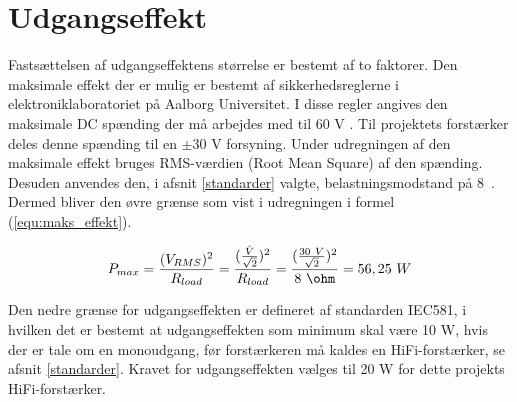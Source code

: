\section{Udgangseffekt}
\label{valg_udgangseffekt}
Fastsættelsen af udgangseffektens størrelse er bestemt af to faktorer. Den maksimale effekt der er mulig er bestemt af sikkerhedsreglerne i elektroniklaboratoriet på Aalborg Universitet. I disse regler angives den maksimale DC spænding der må arbejdes med til 60 V \cite{elregler-b1101}. 
Til projektets forstærker deles denne spænding til en $\pm$30 V forsyning. Under udregningen af den maksimale effekt bruges RMS-værdien (Root Mean Square) af den spænding. Desuden anvendes den, i afsnit \ref{standarder} valgte, belastningsmodstand på 8~\ohm. Dermed bliver den øvre grænse som vist i udregningen i formel (\ref{equ:maks_effekt}).

\begin{equation}
\label{equ:maks_effekt}
P_{max} = \frac{(V_{RMS})^2}{R_{load}}= \frac{(\frac{\hat{V}}{\sqrt{2}})^2}{R_{load}} = \frac{(\frac{30~V}{\sqrt{2}})^2}{8~\ohm} = 56,25~W
\end{equation}

Den nedre grænse for udgangseffekten er defineret af standarden IEC581, i hvilken det er bestemt at udgangseffekten som minimum skal være 10 W, hvis der er tale om en monoudgang, før forstærkeren må kaldes en HiFi-forstærker, se afsnit \ref{standarder}. Kravet for udgangseffekten vælges til 20 W for dette projekts HiFi-forstærker.
